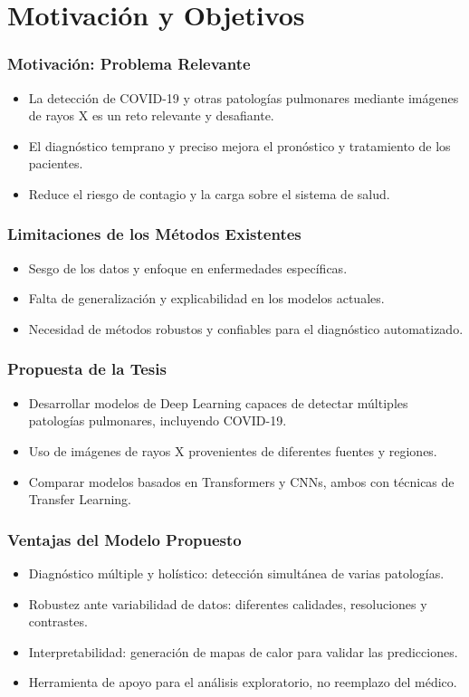 
\section{Motivación y Objetivos}

\begin{frame}
\frametitle{Motivación: Problema Relevante}
\begin{itemize}
    \item La detección de COVID-19 y otras patologías pulmonares mediante imágenes de rayos X es un reto relevante y desafiante.
    \item El diagnóstico temprano y preciso mejora el pronóstico y tratamiento de los pacientes.
    \item Reduce el riesgo de contagio y la carga sobre el sistema de salud.
\end{itemize}
\end{frame}

\begin{frame}
\frametitle{Limitaciones de los Métodos Existentes}
\begin{itemize}
    \item Sesgo de los datos y enfoque en enfermedades específicas.
    \item Falta de generalización y explicabilidad en los modelos actuales.
    \item Necesidad de métodos robustos y confiables para el diagnóstico automatizado.
\end{itemize}
\end{frame}

\begin{frame}
\frametitle{Propuesta de la Tesis}
\begin{itemize}
    \item Desarrollar modelos de Deep Learning capaces de detectar múltiples patologías pulmonares, incluyendo COVID-19.
    \item Uso de imágenes de rayos X provenientes de diferentes fuentes y regiones.
    \item Comparar modelos basados en Transformers y CNNs, ambos con técnicas de Transfer Learning.
\end{itemize}
\end{frame}

\begin{frame}
\frametitle{Ventajas del Modelo Propuesto}
\begin{itemize}
    \item Diagnóstico múltiple y holístico: detección simultánea de varias patologías.
    \item Robustez ante variabilidad de datos: diferentes calidades, resoluciones y contrastes.
    \item Interpretabilidad: generación de mapas de calor para validar las predicciones.
    \item Herramienta de apoyo para el análisis exploratorio, no reemplazo del médico.
\end{itemize}
\end{frame}
